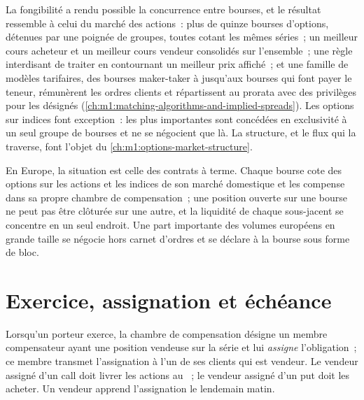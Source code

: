 La fongibilité a rendu possible la concurrence entre bourses, et le résultat
ressemble à celui du marché des actions~: plus de quinze bourses d'options, détenues par une
poignée de groupes, toutes cotant les mêmes séries~; un meilleur cours acheteur et
un meilleur cours vendeur consolidés sur l'ensemble~; une règle interdisant de traiter en contournant un meilleur prix affiché~;
et une famille de modèles tarifaires, des bourses maker-taker à 
jusqu'aux bourses qui font payer le teneur, rémunèrent les ordres clients et
répartissent au prorata avec des privilèges pour les  désignés
(\cref{ch:m1:matching-algorithms-and-implied-spreads}). Les options sur indices font
exception~: les plus importantes sont concédées en exclusivité à un seul groupe de
bourses et ne se négocient que là. La structure, et le flux qui la traverse, font
l'objet du \cref{ch:m1:options-market-structure}.

En Europe, la situation est celle des contrats à terme. Chaque bourse cote des options sur les
actions et les indices de son marché domestique et les compense dans sa propre chambre de
compensation~; une position ouverte sur une bourse ne peut pas être clôturée sur une autre, et la
liquidité de chaque sous-jacent se concentre en un seul endroit. Une part importante des volumes
européens en grande taille se négocie hors carnet d'ordres et se déclare à la bourse sous forme
de bloc.

\section{Exercice, assignation et échéance}

\begin{definition}[Assignation]\label{def:m1:option-contracts-and-exchanges:assignment}
Lorsqu'un porteur exerce, la chambre de compensation désigne un membre compensateur
ayant une position vendeuse sur la série et lui \emph{assigne} l'obligation~; ce
membre transmet l'assignation à l'un de ses clients qui est vendeur. Le vendeur assigné d'un call
doit livrer les actions au ~; le vendeur assigné d'un put doit les
acheter. Un vendeur apprend
l'assignation le lendemain matin.
\end{definition}

